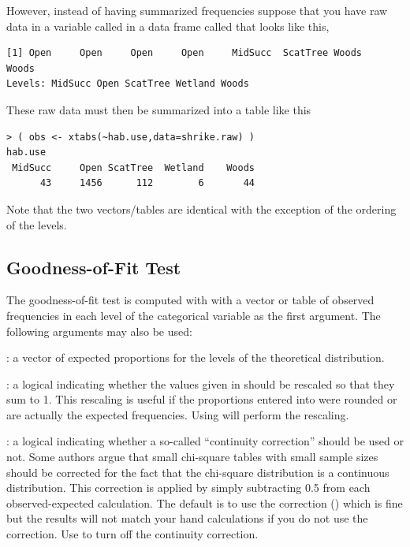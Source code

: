 \documentclass[10pt,openany]{book}\usepackage[]{graphicx}\usepackage[]{color}
\makeatletter
\newenvironment{kframe}{%
 \def\at@end@of@kframe{}%
 \ifinner\ifhmode%
  \def\at@end@of@kframe{\end{minipage}}%
  \begin{minipage}{\columnwidth}%
 \fi\fi%
 \def\FrameCommand##1{\hskip\@totalleftmargin \hskip-\fboxsep
 \colorbox{shadecolor}{##1}\hskip-\fboxsep
     \hskip-\linewidth \hskip-\@totalleftmargin \hskip\columnwidth}%
 \MakeFramed {\advance\hsize-\width
   \@totalleftmargin\z@ \linewidth\hsize
   \@setminipage}}%
 {\par\unskip\endMakeFramed%
 \at@end@of@kframe}
\newenvironment{knitrout}{}{} %
\makeatother
\begin{document}
However, instead of having summarized frequencies suppose that you have raw data in a variable called  in a data frame called  that looks like this,
\begin{knitrout}
\color{fgcolor}\begin{kframe}
\begin{verbatim}
[1] Open     Open     Open     Open     MidSucc  ScatTree Woods    Woods   
Levels: MidSucc Open ScatTree Wetland Woods
\end{verbatim}
\end{kframe}
\end{knitrout}
These raw data must then be summarized into a table like this
\begin{knitrout}
\color{fgcolor}\begin{kframe}
\begin{verbatim}
> ( obs <- xtabs(~hab.use,data=shrike.raw) )
hab.use
 MidSucc     Open ScatTree  Wetland    Woods 
      43     1456      112        6       44 
\end{verbatim}
\end{kframe}
\end{knitrout}
Note that the two vectors/tables are identical with the exception of the ordering of the levels.


\subsection{Goodness-of-Fit Test}
The goodness-of-fit test is computed with  with a vector or table of observed frequencies in each level of the categorical variable as the first argument.  The following arguments may also be used:
\begin{Itemize}
  \item {}: a vector of expected proportions for the levels of the theoretical distribution.
  \item {}: a logical indicating whether the values given in  should be rescaled so that they sum to 1.  This rescaling is useful if the proportions entered into  were rounded or are actually the expected frequencies.  Using  will perform the rescaling.
  \item {}: a logical indicating whether a so-called ``continuity correction'' should be used or not.  Some authors argue that small chi-square tables with small sample sizes should be corrected for the fact that the chi-square distribution is a continuous distribution.  This correction is applied by simply subtracting 0.5 from each observed-expected calculation.  The default is to use the correction () which is fine but the results will not match your hand calculations if you do not use the correction.  Use  to turn off the continuity correction.
\end{Itemize}
\end{document}
